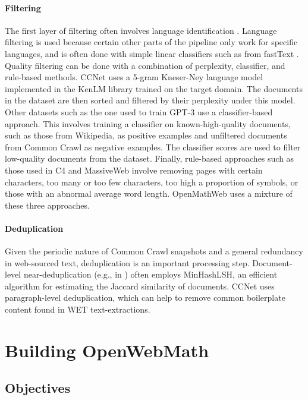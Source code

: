 \paragraph{Filtering} 
The first layer of filtering often involves language identification \citep{wenzek2019ccnet}. Language filtering is used because certain other parts of the pipeline only work for specific languages, and is often done with simple linear classifiers such as from fastText \citep{joulin2016fasttext}. Quality filtering can be done with a combination of perplexity, classifier, and rule-based methods. CCNet uses a 5-gram Kneser-Ney language model implemented in the KenLM library \citep{heafield2011kenlm} trained on the target domain. The documents in the dataset are then sorted and filtered by their perplexity under this model. Other datasets such as the one used to train GPT-3 \citep{gpt3} use a classifier-based approach. This involves training a classifier on known-high-quality documents, such as those from Wikipedia, as positive examples and unfiltered documents from Common Crawl as negative examples. The classifier scores are used to filter low-quality documents from the dataset. Finally, rule-based approaches such as those used in C4 \citep{raffel2020exploring} and MassiveWeb \citep{gopher} involve removing pages with certain characters, too many or too few characters, too high a proportion of symbols, or those with an abnormal average word length. OpenMathWeb uses a mixture of these three approaches.

\paragraph{Deduplication} Given the periodic nature of Common Crawl snapshots and a general redundancy in web-sourced text, deduplication is an important processing step. Document-level near-deduplication (e.g., in \citep{gpt3, refined-web}) often employs MinHashLSH, an efficient algorithm for estimating the Jaccard similarity of documents. CCNet \citep{wenzek2019ccnet} uses paragraph-level deduplication, which can help to remove common boilerplate content found in WET text-extractions.

\section{Building OpenWebMath}

\subsection{Objectives}

